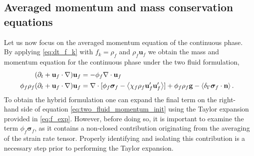 







\subsection{Averaged momentum and mass conservation equations}



Let us now focus on the averaged momentum equation of the continuous phase. 
By applying \eqref{eq:dt_f_k} with $f_k = \rho_f$ and $\rho_f\textbf{u}_f$ we obtain the mass and momentum equation for the continuous phase under the two fluid formulation, 
\begin{align}
    (\pddt + \textbf{u}_f\cdot \grad)\textbf{u}_f&=-\phi_f \div \textbf{u}_f\\
    \phi_f \rho_f(\pddt + \textbf{u}_f  \cdot \grad) \textbf{u}_f
    &= 
    \div [\phi_f \bm\sigma_f-  \avg{\chi_f\rho_f \textbf{u}_f'\textbf{u}_f'}]
    + \phi_f \rho_f \textbf{g}
    - \avg{\delta_\Gamma \bm\sigma_f\cdot \textbf{n}}.
    \label{eq:two_fluid_momentum_init}
\end{align} 
To obtain the hybrid formulation one can expand the final term on the right-hand side of equation \ref{eq:two_fluid_momentum_init} using the Taylor expansion provided in \ref{eq:f_exp}.  
However, before doing so, it is important to examine the term \( \phi_f \bm\sigma_f \), as it contains a non-closed contribution originating from the averaging of the strain rate tensor. %
Properly identifying and isolating this contribution is a necessary step prior to performing the Taylor expansion.


